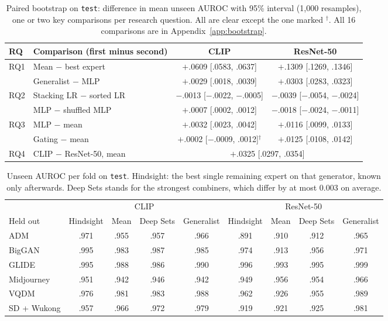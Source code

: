 \documentclass[10pt,a4paper]{article}
\begin{document}
\begin{table}[t]
\centering
\small
\setlength{\tabcolsep}{4pt}
\begin{tabular}{llcc}
\toprule
RQ & Comparison (first minus second) & CLIP & ResNet-50 \\
\midrule
RQ1 & Mean $-$ best expert & $+$.0609 [.0583, .0637] & $+$.1309 [.1269, .1346] \\
    & Generalist $-$ MLP & $+$.0029 [.0018, .0039] & $+$.0303 [.0283, .0323] \\
\midrule
RQ2 & Stacking LR $-$ sorted LR & $-$.0013 [$-$.0022, $-$.0005] & $-$.0039 [$-$.0054, $-$.0024] \\
    & MLP $-$ shuffled MLP & $+$.0007 [.0002, .0012] & $-$.0018 [$-$.0024, $-$.0011] \\
\midrule
RQ3 & MLP $-$ mean & $+$.0032 [.0023, .0042] & $+$.0116 [.0099, .0133] \\
    & Gating $-$ mean & $+$.0002 [$-$.0009, .0012]$^\dagger$ & $+$.0125 [.0108, .0142] \\
\midrule
RQ4 & CLIP $-$ ResNet-50, mean & \multicolumn{2}{c}{$+$.0325 [.0297, .0354]} \\
\bottomrule
\end{tabular}
\caption{Paired bootstrap on \texttt{test}: difference in mean unseen AUROC with 95\% interval (1,000 resamples), one or two key comparisons per research question. All are clear except the one marked $^\dagger$. All 16 comparisons are in Appendix~\ref{app:bootstrap}.}
\label{tab:bootstrap}
\end{table}

\begin{table}[t]
\centering
\small
\setlength{\tabcolsep}{4pt}
\begin{tabular}{lcccccccc}
\toprule
 & \multicolumn{4}{c}{CLIP} & \multicolumn{4}{c}{ResNet-50} \\
\cmidrule(lr){2-5}\cmidrule(lr){6-9}
Held out & Hindsight & Mean & Deep Sets & Generalist & Hindsight & Mean & Deep Sets & Generalist \\
\midrule
ADM & .971 & .955 & .957 & .966 & .891 & .910 & .912 & .965 \\
BigGAN & .995 & .983 & .987 & .985 & .974 & .913 & .956 & .971 \\
GLIDE & .995 & .988 & .986 & .990 & .996 & .993 & .995 & .999 \\
Midjourney & .951 & .942 & .946 & .942 & .949 & .956 & .954 & .966 \\
VQDM & .976 & .981 & .983 & .988 & .962 & .926 & .955 & .989 \\
SD + Wukong & .957 & .966 & .972 & .979 & .919 & .921 & .925 & .981 \\
\bottomrule
\end{tabular}
\caption{Unseen AUROC per fold on \texttt{test}. Hindsight: the best single remaining expert on that generator, known only afterwards. Deep Sets stands for the strongest combiners, which differ by at most 0.003 on average.}
\label{tab:folds}
\end{table}
\end{document}
